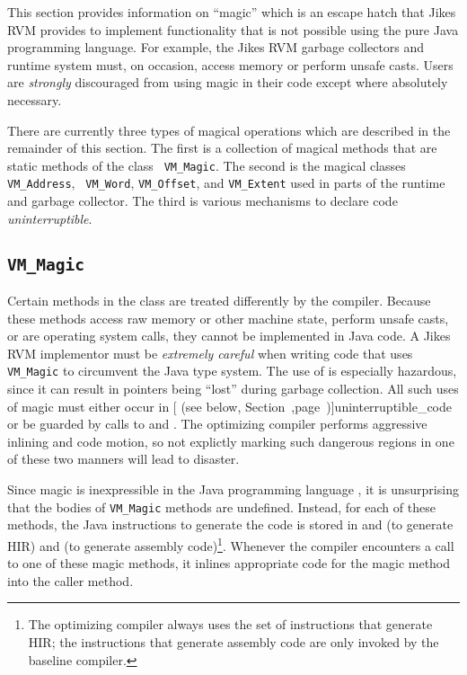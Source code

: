 This section provides information on ``magic'' which is an escape
hatch that Jikes\TMweb{} RVM provides to implement
functionality that is not 
possible using the pure Java\TMweb{} programming language.  For example, the Jikes RVM garbage
collectors and 
runtime system must, on occasion, access memory or perform unsafe
casts.  Users are {\it strongly} discouraged from using magic in their code
except where absolutely necessary.  

There are currently three types of magical operations which are
described in the remainder of this section.  The first is a collection
of magical methods that are static methods of the class {\tt
VM\_Magic}.  The second is the magical classes {\tt VM\_Address}, {\tt
VM\_Word}, {\tt VM\_Offset}, and  {\tt VM\_Extent} used in
parts of the runtime and garbage collector. The third is various
mechanisms to declare code {\em uninterruptible}.

\subsection{\texttt{VM\_Magic}}%
%
%
Certain methods in the class  are
treated differently by the compiler. Because these methods access raw
memory or other machine state, perform unsafe casts, or are operating
system calls, they cannot be implemented in Java code.  A
Jikes\TMweb{} RVM implementor must be {\em extremely careful} when
writing code that uses {\tt VM\_Magic} to circumvent the Java type
system.  The use of  is especially hazardous, since it can
result in pointers being ``lost'' during garbage collection.  All such
uses of magic must either occur in [
(see below, Section~\Ref,page~\Pageref)]{uninterruptible_code}
or be guarded by calls to  and .
The optimizing compiler performs aggressive inlining and code motion, so
not explictly marking such dangerous regions in one of these two
manners will lead to disaster.

Since magic is inexpressible in the Java programming language , it is
unsurprising that the bodies of {\tt VM\_Magic} methods are undefined.
Instead, for each of these methods, the Java instructions to generate
the code is stored in
 and 
 (to generate HIR) and 
 (to generate assembly code)\footnote{The optimizing
compiler always uses the set of instructions that generate HIR; the
instructions that generate assembly code are only invoked by the
baseline compiler.}.  Whenever the compiler encounters a call to one of these
magic methods, it inlines appropriate code for the magic method into the caller method.

